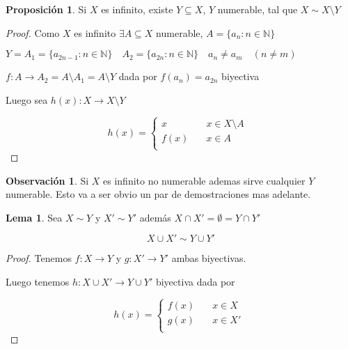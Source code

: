 \documentclass[12pt]{article}
\newcommand{\N}{\mathbb{N}}
\newcommand{\ra}{\rightarrow}
\theoremstyle{definition}
\newtheorem*{remark}{Observación}
\newtheorem{lemma}[theorem]{Lema}
\newtheorem{prop}{Proposición}
\begin{document}
\begin{prop}
  Si $X$ es infinito, existe $Y \subseteq X$, $ Y$ numerable, tal que $X \sim X \setminus Y$

  \begin{proof}
  Como $X$ es infinito $\exists A \subseteq X$ numerable, $A = \{a_{n}: n \in \N\}$

  $Y = A_{1} = \{a_{2n -1} : n \in \N \} \quad A_{2} = \{a_{2n} : n \in \N \} \quad a_{n} \neq a_{m} \quad (n \neq m)$ 

  $f : A \ra A_{2} = A \setminus A_{1} = A \setminus Y$ dada por $f(a_{n}) = a_{2n}$ biyectiva 

  Luego sea $h(x): X \ra X \setminus Y$ 

\[
h(x) =
     \begin{cases}
       \text{$x$} &\quad\text{$x \in X \setminus A$ }\\
       \text{$f(x)$} &\quad\text{$x \in A$} \\
     \end{cases}
\]

  \end{proof}
\end{prop}

\begin{remark}
  Si $X$ es infinito no numerable ademas sirve cualquier $Y$ numerable. Esto va a ser obvio un par de demostraciones mas adelante. 
\end{remark}

\begin{lemma}
  Sea $X \sim Y$ y $X' \sim Y'$ además $X \cap X' = \emptyset = Y \cap Y'$

  $$ X \cup X' \sim Y \cup Y'$$

  \begin{proof}
    Tenemos $f: X \ra Y$ y $g: X' \ra Y'$ ambas biyectivas.

    Luego tenemos $h: X \cup X' \ra Y \cup Y'$ biyectiva dada por

\[
h(x) =
     \begin{cases}
       \text{$f(x)$} &\quad\text{$x \in X$ }\\
       \text{$g(x)$} &\quad\text{$x \in X'$} \\
     \end{cases}
\]



  \end{proof}
\end{lemma}
\end{document}
